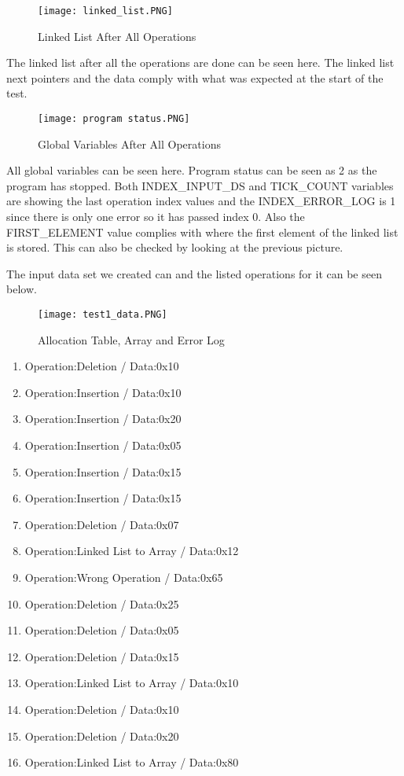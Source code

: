 \documentclass[pdftex,12pt,a4paper]{article}
\begin{document}
\begin{figure}[H]
	\centering
	\texttt{[image: linked\_list.PNG]}	
	\caption{Linked List After All Operations}
	\label{fig1}
\end{figure}

The linked list after all the operations are done can be seen here. The linked list next pointers and the data comply with what was expected at the start of the test. 

\begin{figure}[H]
	\centering
	\texttt{[image: program status.PNG]}	
	\caption{Global Variables After All Operations}
	\label{fig1}
\end{figure}

All global variables can be seen here. Program status can be seen as 2 as the program has stopped. Both INDEX\_INPUT\_DS  and TICK\_COUNT variables are showing the last operation index values and the INDEX\_ERROR\_LOG is 1 since there is only one error so it has passed index 0. Also the FIRST\_ELEMENT value complies with where the first element of the linked list is stored. This can also be checked by looking at the previous picture.

The input data set we created can and the listed operations for it can be seen below. 

\begin{figure}[H]
	\centering
	\texttt{[image: test1\_data.PNG]}	
	\caption{Allocation Table, Array and Error Log}
	\label{fig1}
\end{figure}

\begin{enumerate}
  \item Operation:Deletion / Data:0x10
  \item Operation:Insertion / Data:0x10
  \item Operation:Insertion / Data:0x20
  \item Operation:Insertion / Data:0x05
  \item Operation:Insertion / Data:0x15
  \item Operation:Insertion / Data:0x15
  \item Operation:Deletion / Data:0x07
  \item Operation:Linked List to Array / Data:0x12
  \item Operation:Wrong Operation / Data:0x65
  \item Operation:Deletion / Data:0x25
  \item Operation:Deletion / Data:0x05
  \item Operation:Deletion / Data:0x15
  \item Operation:Linked List to Array  / Data:0x10
  \item Operation:Deletion / Data:0x10
  \item Operation:Deletion / Data:0x20
  \item Operation:Linked List to Array / Data:0x80
\end{enumerate}
\end{document}
